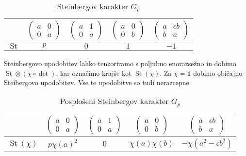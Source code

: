 \documentclass[11pt]{book}
\def\11{\mathbf{1}}
\DeclareMathOperator\St{St}
\theoremstyle{definition}
\theoremstyle{zgled}
\theoremstyle{odprtproblem}
\theoremstyle{domacanaloga}
\theoremstyle{izrek}
\begin{document}
\begin{table}[ht]
    \centering
\begin{tabular}{l|*{4}{c}}
    & 
    $\begin{pmatrix}
        a & 0 \\ 0 & a
    \end{pmatrix}$
    &
    $\begin{pmatrix}
        a & 1 \\ 0 & a
    \end{pmatrix}$
    &
    $\begin{pmatrix}
        a & 0 \\ 0 & b
    \end{pmatrix}$
    &
    $\begin{pmatrix}
        a & \epsilon b \\ b & a
    \end{pmatrix}$ \\ \hline
    $\St$ & $p$ & $0$ & $1$ & $-1$ \\
\end{tabular}
\caption{Steinbergov karakter $G_p$}
\end{table}

Steinbergovo upodobitev lahko tenzoriramo s poljubno enorazsežno in dobimo $\St \otimes (\chi \circ \det)$, kar označimo krajše kot $\St(\chi)$. Za $\chi = \11$ dobimo običajno Steibergovo upodobitev. Vse te upodobitve so tudi nerazcepne.

\begin{table}[ht]
    \centering
\begin{tabular}{l|*{4}{c}}
    & 
    $\begin{pmatrix}
        a & 0 \\ 0 & a
    \end{pmatrix}$
    &
    $\begin{pmatrix}
        a & 1 \\ 0 & a
    \end{pmatrix}$
    &
    $\begin{pmatrix}
        a & 0 \\ 0 & b
    \end{pmatrix}$
    &
    $\begin{pmatrix}
        a & \epsilon b \\ b & a
    \end{pmatrix}$ \\ \hline
    $\St(\chi)$ & $p \chi(a)^2$ & $0$ & $\chi(a) \chi(b)$ & $- \chi(a^2 - \epsilon b^2)$ \\
\end{tabular}
\caption{Posplošeni Steinbergov karakter $G_p$}
\end{table}
\end{document}
